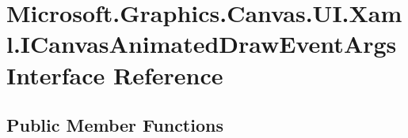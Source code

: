 \hypertarget{interface_microsoft_1_1_graphics_1_1_canvas_1_1_u_i_1_1_xaml_1_1_i_canvas_animated_draw_event_args}{}\section{Microsoft.\+Graphics.\+Canvas.\+U\+I.\+Xaml.\+I\+Canvas\+Animated\+Draw\+Event\+Args Interface Reference}
\label{interface_microsoft_1_1_graphics_1_1_canvas_1_1_u_i_1_1_xaml_1_1_i_canvas_animated_draw_event_args}
\subsection*{Public Member Functions}
